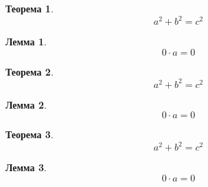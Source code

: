 \documentclass[a4paper, 12pt]{article}
\theoremstyle{plain} %
\newtheorem{theorem}{Теорема} %
\newtheorem{lemma}{Лемма} %
\begin{document}
    \begin{theorem} %
        \[a^2 + b^2 = c^2\]
    \end{theorem}

    \begin{lemma} %
        \[0 \cdot a = 0\]
    \end{lemma}

    \begin{theorem} %
        \[a^2 + b^2 = c^2\]
    \end{theorem}

    \begin{lemma} %
        \[0 \cdot a = 0\]
    \end{lemma}

    \begin{theorem} %
        \[a^2 + b^2 = c^2\]
    \end{theorem}

    \begin{lemma} %
        \[0 \cdot a = 0\]
    \end{lemma}
\end{document}
